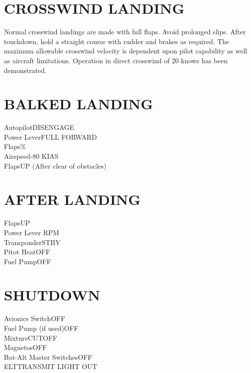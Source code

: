 \documentclass{article}
\begin{document}
\begin{multicols*}{2}
\section*{CROSSWIND LANDING}
Normal crosswind landings are made with full flaps. Avoid prolonged slips. After touchdown, hold a straight course with rudder and brakes as required. The maximum allowable crosswind velocity is dependent upon pilot capability as well as aircraft limitations. Operation in direct crosswind of 20 knows has been demonstrated.
\section*{BALKED LANDING}
Autopilot\dotfill DISENGAGE\\
Power Lever\dotfill FULL FORWARD\\
Flaps\%\\
Airspeed-80 KIAS\\
Flaps\dotfill UP (After clear of obstacles)
\section*{AFTER LANDING}
Flaps\dotfill UP\\
Power Lever RPM\\
Transponder\dotfill STBY\\
Pitot Heat\dotfill OFF\\
Fuel Pump\dotfill OFF\\
\section*{SHUTDOWN}
Avionics Switch\dotfill OFF\\
Fuel Pump (if used)\dotfill OFF\\
Mixture\dotfill CUTOFF\\
Magnetos\dotfill OFF\\
Bat-Alt Master Switches\dotfill OFF\\
ELT\dotfill TRANSMIT LIGHT OUT
\vfill\null
\vspace*{-1em}

\end{multicols*}
\end{document}
